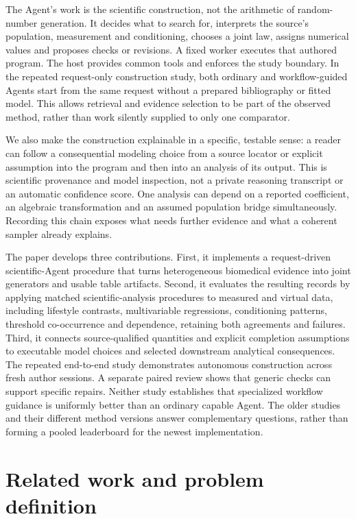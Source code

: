 \documentclass[11pt,letterpaper]{article}
\begin{document}
The Agent's work is the scientific construction, not the arithmetic of random-number generation. It decides what to search for, interprets the source's population, measurement and conditioning, chooses a joint law, assigns numerical values and proposes checks or revisions. A fixed worker executes that authored program. The host provides common tools and enforces the study boundary. In the repeated request-only construction study, both ordinary and workflow-guided Agents start from the same request without a prepared bibliography or fitted model. This allows retrieval and evidence selection to be part of the observed method, rather than work silently supplied to only one comparator.


We also make the construction explainable in a specific, testable sense: a reader can follow a consequential modeling choice from a source locator or explicit assumption into the program and then into an analysis of its output. This is scientific provenance and model inspection, not a private reasoning transcript or an automatic confidence score. One analysis can depend on a reported coefficient, an algebraic transformation and an assumed population bridge simultaneously. Recording this chain exposes what needs further evidence and what a coherent sampler already explains.


The paper develops three contributions. First, it implements a request-driven scientific-Agent procedure that turns heterogeneous biomedical evidence into joint generators and usable table artifacts. Second, it evaluates the resulting records by applying matched scientific-analysis procedures to measured and virtual data, including lifestyle contrasts, multivariable regressions, conditioning patterns, threshold co-occurrence and dependence, retaining both agreements and failures. Third, it connects source-qualified quantities and explicit completion assumptions to executable model choices and selected downstream analytical consequences. The repeated end-to-end study demonstrates autonomous construction across fresh author sessions. A separate paired review shows that generic checks can support specific repairs. Neither study establishes that specialized workflow guidance is uniformly better than an ordinary capable Agent. The older studies and their different method versions answer complementary questions, rather than forming a pooled leaderboard for the newest implementation.



\section{Related work and problem definition}
\end{document}
